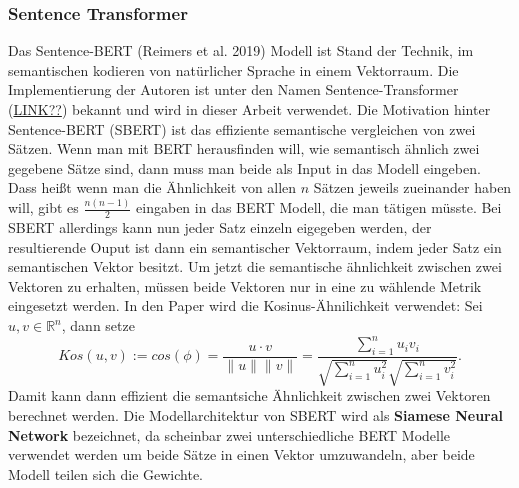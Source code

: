 \documentclass[12pt,letterpaper,ngerman]{article}
\begin{document}
\subsubsection{Sentence Transformer}
Das Sentence-BERT (Reimers et al. 2019) Modell ist Stand der Technik,
im semantischen kodieren von natürlicher Sprache in einem Vektorraum.
Die Implementierung der Autoren ist unter den Namen Sentence-Transformer 
(\underline{LINK??})
bekannt und wird in dieser Arbeit verwendet. Die Motivation hinter Sentence-BERT
(SBERT) ist das effiziente semantische vergleichen von zwei Sätzen. Wenn man mit
BERT herausfinden will, wie semantisch ähnlich zwei gegebene Sätze sind, dann muss 
man beide als Input in das Modell eingeben. Dass heißt wenn man die Ähnlichkeit
von allen $n$ Sätzen jeweils zueinander haben will, gibt es $\frac{n(n-1)}{2}$
eingaben in das BERT Modell, die man tätigen müsste. Bei SBERT allerdings kann 
nun jeder Satz einzeln eigegeben werden, der resultierende Ouput ist dann 
ein semantischer Vektorraum, indem jeder Satz ein semantischen Vektor besitzt.
Um jetzt die semantische ähnlichkeit zwischen zwei Vektoren zu erhalten, müssen
beide Vektoren nur in eine zu wählende Metrik eingesetzt werden. In den Paper
wird die Kosinus-Ähnilichkeit verwendet: Sei $u,v \in \mathbb{R}^n$, dann setze
\[
  Kos(u,v) := cos(\phi) = \frac{u \cdot v}{\|u\|\|v\|} 
  = \frac
  {
    \sum_{i=1}^n u_iv_i
  }
  {
    \sqrt{\sum_{i=1}^n u_i^2} \sqrt{\sum_{i=1}^n v_i^2}
  }.
\]
Damit kann dann effizient die semantsiche Ähnlichkeit zwischen zwei Vektoren
berechnet werden. Die Modellarchitektur von SBERT wird als {\bf Siamese Neural Network }
bezeichnet, da scheinbar zwei unterschiedliche BERT Modelle verwendet werden
um beide Sätze in einen Vektor umzuwandeln, aber beide Modell teilen sich 
die Gewichte. 
\end{document}
